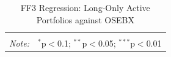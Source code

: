 \begin{appendices}
\begin{table}[H]
\begin{tabularx}{\textwidth}{XXXXXXXXXXl}
\hline 
\hline \\[-2ex] 
\textit{Note:}  & \multicolumn{10}{r}{$^{*}$p$<$0.1; $^{**}$p$<$0.05; $^{***}$p$<$0.01} \\ 
\end{tabularx}
\vspace{1em}
\caption{{FF3 Regression: Long-Only Active Portfolios against OSEBX}} 
\label{FF3-long-only-active-osebx} 
\end{table} 






\end{appendices}

